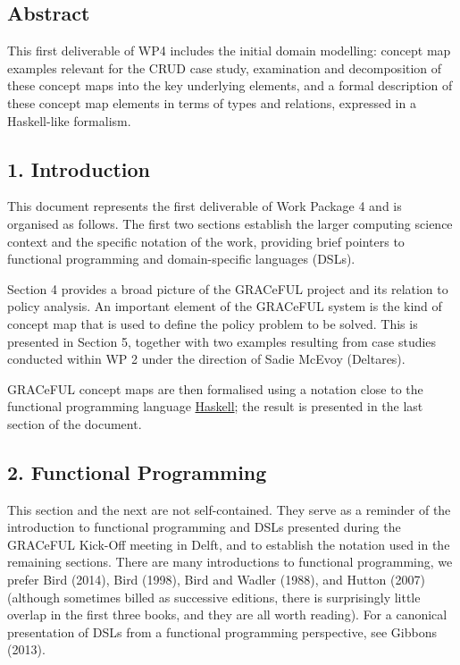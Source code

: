 \documentclass[]{article}
\begin{document}
\vfill

\tableofcontents

\vfill

\newpage

\subsection{Abstract}\label{abstract}

This first deliverable of WP4 includes the initial domain modelling:
concept map examples relevant for the CRUD case study, examination and
decomposition of these concept maps into the key underlying elements,
and a formal description of these concept map elements in terms of types
and relations, expressed in a Haskell-like formalism.

\subsection{1. Introduction}\label{introduction}

This document represents the first deliverable of Work Package 4 and is
organised as follows. The first two sections establish the larger
computing science context and the specific notation of the work,
providing brief pointers to functional programming and domain-specific
languages (DSLs).

Section 4 provides a broad picture of the GRACeFUL project and its
relation to policy analysis. An important element of the GRACeFUL system
is the kind of concept map that is used to define the policy problem to
be solved. This is presented in Section 5, together with two examples
resulting from case studies conducted within WP 2 under the direction of
Sadie McEvoy (Deltares).

GRACeFUL concept maps are then formalised using a notation close to the
functional programming language
\href{https://www.haskell.org/}{Haskell}; the result is presented in the
last section of the document.

\subsection{2. Functional Programming}\label{functional-programming}

This section and the next are not self-contained. They serve as a
reminder of the introduction to functional programming and DSLs
presented during the GRACeFUL Kick-Off meeting in Delft, and to
establish the notation used in the remaining sections. There are many
introductions to functional programming, we prefer Bird (2014), Bird
(1998), Bird and Wadler (1988), and Hutton (2007) (although sometimes
billed as successive editions, there is surprisingly little overlap in
the first three books, and they are all worth reading). For a canonical
presentation of DSLs from a functional programming perspective, see
Gibbons (2013).
\end{document}
